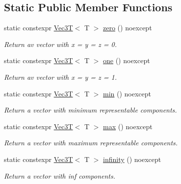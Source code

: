 \subsection*{Static Public Member Functions}
\begin{DoxyCompactItemize}
\item 
\mbox{\label{classVec3T_af438ba5c8990b07e566bf7e48dcbcfb2}} 
static constexpr \hyperlink{classVec3T}{Vec3T}$<$ T $>$ \hyperlink{classVec3T_af438ba5c8990b07e566bf7e48dcbcfb2}{zero} () noexcept
\begin{DoxyCompactList}\small\item\em Return av vector with x = y = z = 0. \end{DoxyCompactList}\item 
\mbox{\label{classVec3T_a82237dfeed4017e952c893817afc3827}} 
static constexpr \hyperlink{classVec3T}{Vec3T}$<$ T $>$ \hyperlink{classVec3T_a82237dfeed4017e952c893817afc3827}{one} () noexcept
\begin{DoxyCompactList}\small\item\em Return av vector with x = y = z = 1. \end{DoxyCompactList}\item 
\mbox{\label{classVec3T_a4f27fdac2e6ac4feffe148bb8857f8bc}} 
static constexpr \hyperlink{classVec3T}{Vec3T}$<$ T $>$ \hyperlink{classVec3T_a4f27fdac2e6ac4feffe148bb8857f8bc}{min} () noexcept
\begin{DoxyCompactList}\small\item\em Return a vector with minimum representable components. \end{DoxyCompactList}\item 
\mbox{\label{classVec3T_af06b99bd905435060149a61a13f61546}} 
static constexpr \hyperlink{classVec3T}{Vec3T}$<$ T $>$ \hyperlink{classVec3T_af06b99bd905435060149a61a13f61546}{max} () noexcept
\begin{DoxyCompactList}\small\item\em Return a vector with maximum representable components. \end{DoxyCompactList}\item 
\mbox{\label{classVec3T_ad88913a21fd56327b28092c2e39ebc3e}} 
static constexpr \hyperlink{classVec3T}{Vec3T}$<$ T $>$ \hyperlink{classVec3T_ad88913a21fd56327b28092c2e39ebc3e}{infinity} () noexcept
\begin{DoxyCompactList}\small\item\em Return a vector with inf components. \end{DoxyCompactList}\end{DoxyCompactItemize}
